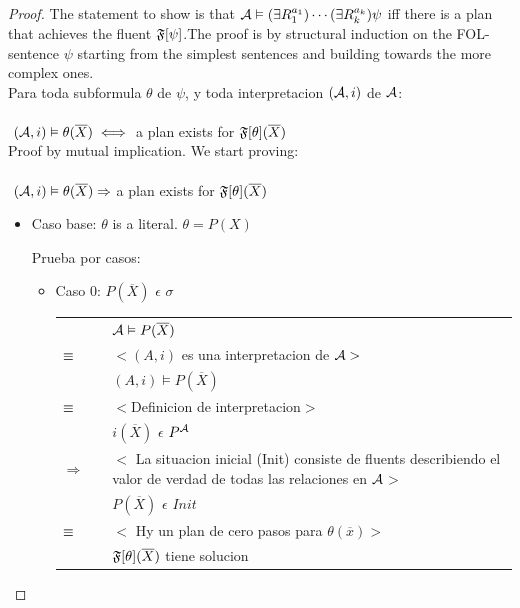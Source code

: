 \begin{proof}
	The statement to show is that
$\mathcal{A}\vDash(\exists R_1^{a_1})\cdots(\exists R_k^{a_k})\psi$ iff
there is a plan that achieves the fluent $\mathfrak{F}[\psi]$.The proof is by structural induction on the FOL-sentence $\psi$ starting from the simplest sentences and building 
towards the more complex ones. \\

Para toda subformula $\theta$ de $\psi$, y toda interpretacion $(\mathcal{A},i)$ de $\mathcal{A}$:\\ \\
$ $ \hspace*{3cm} $(\mathcal{A},i) \vDash \theta(\overline{X}) \iff$ a plan exists for $\mathfrak{F}[\theta](\overline{X})$ \\

Proof by mutual implication.
We start proving:\\ \\
$ $ \hspace*{3cm} $(\mathcal{A},i) \vDash \theta(\overline{X}) \Rightarrow $ a plan exists for $\mathfrak{F}[\theta](\overline{X})$ \\
\begin{itemize}
		\item Caso base: $\theta$ is a literal. $\theta = P(X)$ 
		
		Prueba por casos:
			\begin{itemize}
				\item Caso 0: $P(\overline{X})$ $\epsilon$ $\sigma$
				
				\begin{tabular}{@{}p{1mm}p{1mm}p{11cm}}	
						& & $\mathcal{A} \vDash P(\overline{X})$\\
						$\equiv$ & & $<(A,i)$ es una interpretacion de $\mathcal{A}>$ \\
						& & $(A,i) \models P(\overline{X})$ \\
						$\equiv$ & & $<$Definicion de interpretacion$>$\\
						& & $i(\overline{X})$ $\epsilon$ $P^{\mathcal{A}}$\\
						$\Rightarrow$ & & $<$ La situacion inicial (Init) consiste de fluents describiendo el valor de 
									  verdad de todas las relaciones en $\mathcal{A}$$>$\\
						& & $P(\overline{X})$ $\epsilon$ $Init$ \\
						$\equiv$ & & $<$ Hy un plan de cero pasos para $\theta(\overline{x})>$\\
						& & $\mathfrak{F}[\theta](\overline{X})$ tiene solucion
					\end{tabular}
					

\end{itemize}
\end{itemize}
\end{proof}
